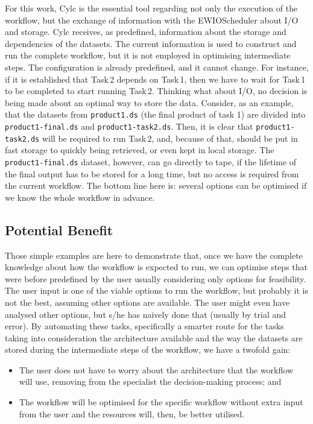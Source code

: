 \documentclass[a4paper]{article}
\begin{document}
For this work, Cylc is the essential tool regarding not only the execution of the workflow, but the exchange of information with the EWIOScheduler about I/O and storage.
Cylc receives, as predefined, information about the storage and dependencies of the datasets. The current information is used to construct and run the complete workflow, but it is not employed in optimising intermediate steps.
The configuration is already predefined, and it cannot change. For instance, if it is established that Task\,2 depends on Task\,1, then we have to wait for Task\,1 to be completed to start running Task\,2.
Thinking what about I/O, no decision is being made about an optimal way to store the data.
Consider, as an example, that the datasets from \texttt{product1.ds} (the final product of task 1) are divided into \texttt{product1-final.ds} and \texttt{product1-task2.ds}. Then, it is clear that \texttt{product1-task2.ds} will be required to run Task\,2, and, because of that, should be put in fast storage to quickly being retrieved, or even kept in local storage. The \texttt{product1-final.ds} dataset, however, can go directly to tape, if the lifetime of the final output has to be stored for a long time, but no access is required from the current workflow.
The bottom line here is: several options can be optimised if we know the whole workflow in advance.

\subsection{Potential Benefit}

Those simple examples are here to demonstrate that, once we have the complete knowledge about how the workflow is expected to run, we can optimise steps that were before predefined by the user usually considering only options for feasibility. The user input is one of the viable options to run the workflow, but probably it is not the best, assuming other options are available. The user might even have analysed other options, but s/he has naively done that (usually by trial and error). By automating these tasks, specifically a smarter route for the tasks taking into consideration the architecture available and the way the datasets are stored during the intermediate steps of the workflow, we have a twofold gain:

\begin{itemize}

\item The user does not have to worry about the architecture that the workflow will use, removing from the specialist the decision-making process; and

\item The workflow will be optimised for the specific workflow without extra input from the user and the resources will, then, be better utilised.

\end{itemize}
\end{document}
